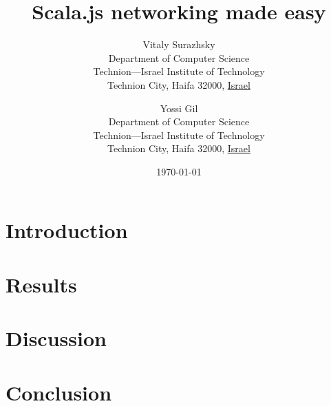 \documentclass[12pt]{article}
\begin{document}


\title{Scala.js networking made easy}

\author{
  Vitaly Surazhsky \\
          Department of Computer Science\\
  Technion---Israel Institute of Technology\\
  Technion City, Haifa 32000, \underline{Israel}
      \and
  Yossi Gil\\
  Department of Computer Science\\
  Technion---Israel Institute of Technology\\
  Technion City, Haifa 32000, \underline{Israel}
}
\date{\today}

\maketitle

\begin{abstract}

\end{abstract}

\section{Introduction}\label{introduction}


\section{Results}\label{results}


\section{Discussion}\label{discussion}


\section{Conclusion}\label{conclusion}




\end{document}

